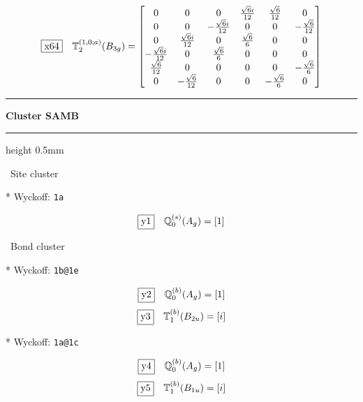 \documentclass[fleqn,10pt,landscape]{jsarticle}
\begin{document}
\begin{dmath*}
\fbox{x64}\quad \mathbb{T}_{2}^{(1,0;a)}(B_{3g})=\begin{bmatrix} 0 & 0 & 0 & \frac{\sqrt{6} i}{12} & \frac{\sqrt{6}}{12} & 0 \\ 0 & 0 & - \frac{\sqrt{6} i}{12} & 0 & 0 & - \frac{\sqrt{6}}{12} \\ 0 & \frac{\sqrt{6} i}{12} & 0 & \frac{\sqrt{6}}{6} & 0 & 0 \\ - \frac{\sqrt{6} i}{12} & 0 & \frac{\sqrt{6}}{6} & 0 & 0 & 0 \\ \frac{\sqrt{6}}{12} & 0 & 0 & 0 & 0 & - \frac{\sqrt{6}}{6} \\ 0 & - \frac{\sqrt{6}}{12} & 0 & 0 & - \frac{\sqrt{6}}{6} & 0 \end{bmatrix}
\end{dmath*}
\vspace{5mm}
\noindent \rule[0.5mm]{5mm}{0.5mm}\hspace{3mm}\textbf{Cluster SAMB}\hspace{3mm}\leaders\hrule height 0.5mm\hfill\kern0pt
\vspace{3mm}

\noindent\textbullet\, Site cluster

\vspace{5mm}

\noindent ** Wyckoff: \texttt{1a}

\begin{dmath*}
\fbox{y1}\quad \mathbb{Q}_{0}^{(s)}(A_{g})=\left[ 1 \right]
\end{dmath*}
\vspace{5mm}

\noindent\textbullet\, Bond cluster

\vspace{5mm}

\noindent ** Wyckoff: \texttt{1b@1e}

\begin{dmath*}
\fbox{y2}\quad \mathbb{Q}_{0}^{(b)}(A_{g})=\left[ 1 \right]
\end{dmath*}
\begin{dmath*}
\fbox{y3}\quad \mathbb{T}_{1}^{(b)}(B_{2u})=\left[ i \right]
\end{dmath*}
\vspace{5mm}

\noindent ** Wyckoff: \texttt{1a@1c}

\begin{dmath*}
\fbox{y4}\quad \mathbb{Q}_{0}^{(b)}(A_{g})=\left[ 1 \right]
\end{dmath*}
\begin{dmath*}
\fbox{y5}\quad \mathbb{T}_{1}^{(b)}(B_{1u})=\left[ i \right]
\end{dmath*}
\vspace{5mm}
\end{document}
